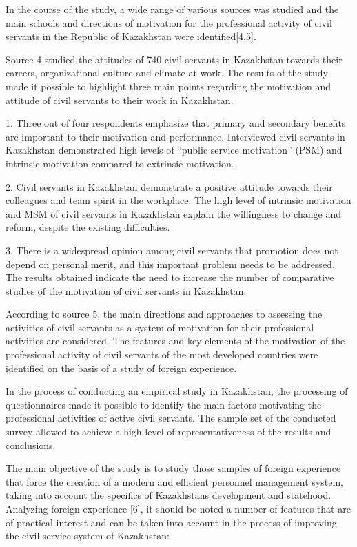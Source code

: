 \begin{multicols}{2}
In the course of the study, a wide range of various sources was studied
and the main schools and directions of motivation for the professional
activity of civil servants in the Republic of Kazakhstan were
identified{[}4,5{]}.

Source 4 studied the attitudes of 740 civil servants in Kazakhstan
towards their careers, organizational culture and climate at work. The
results of the study made it possible to highlight three main points
regarding the motivation and attitude of civil servants to their work in
Kazakhstan.

1. Three out of four respondents emphasize that primary and secondary
benefits are important to their motivation and performance. Interviewed
civil servants in Kazakhstan demonstrated high levels of ``public
service motivation'' (PSM) and intrinsic motivation compared to
extrinsic motivation.

2. Civil servants in Kazakhstan demonstrate a positive attitude towards
their colleagues and team spirit in the workplace. The high level of
intrinsic motivation and MSM of civil servants in Kazakhstan explain the
willingness to change and reform, despite the existing difficulties.

3. There is a widespread opinion among civil servants that promotion
does not depend on personal merit, and this important problem needs to
be addressed. The results obtained indicate the need to increase the
number of comparative studies of the motivation of civil servants in
Kazakhstan.

According to source 5, the main directions and approaches to assessing
the activities of civil servants as a system of motivation for their
professional activities are considered. The features and key elements of
the motivation of the professional activity of civil servants of the
most developed countries were identified on the basis of a study of
foreign experience.

In the process of conducting an empirical study in Kazakhstan, the
processing of questionnaires made it possible to identify the main
factors motivating the professional activities of active civil servants.
The sample set of the conducted survey allowed to achieve a high level
of representativeness of the results and conclusions.

The main objective of the study is to study those samples of foreign
experience that force the creation of a modern and efficient personnel
management system, taking into account the specifics of
Kazakhstan\textquotesingle s development and statehood. Analyzing
foreign experience {[}6{]}, it should be noted a number of features that
are of practical interest and can be taken into account in the process
of improving the civil service system of Kazakhstan:


\end{multicols}
